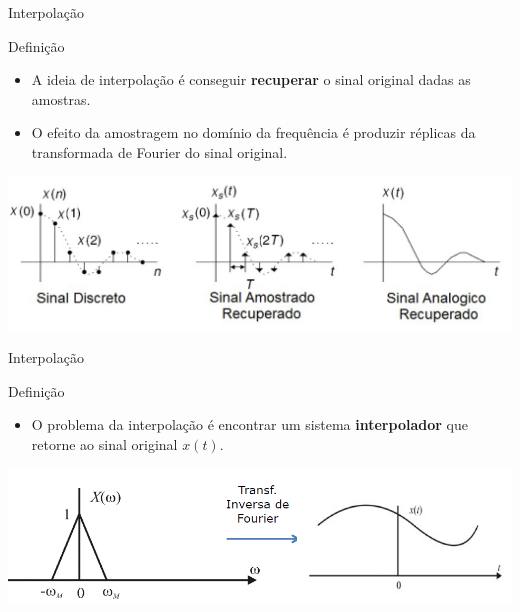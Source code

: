 \begin{frame}{Interpolação}
\begin{block}{Definição}
\begin{itemize}
    \item A ideia de interpolação é conseguir \textbf{recuperar} o sinal original dadas as amostras.
    \item O efeito da amostragem no domínio da frequência é produzir réplicas da transformada de Fourier do sinal original.
\end{itemize}
\end{block}
\vspace{0.5cm}
\centerline{\includegraphics[width=1.1\linewidth]{Figuras/Ch02/fig13.PNG}}
\end{frame}

\begin{frame}{Interpolação}
\begin{block}{Definição}
\begin{itemize}
    \item O problema da interpolação é encontrar um sistema \textbf{interpolador} que retorne ao sinal original $x(t)$.
\end{itemize}
\end{block}
\vspace{0.5cm}
\centerline{\includegraphics[width=1.1\linewidth]{Figuras/Ch02/fig14.PNG}}
\end{frame}

